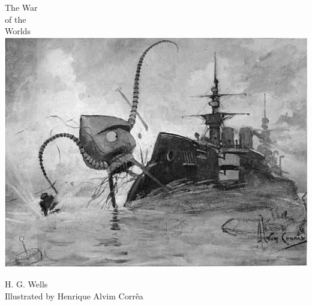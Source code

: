 \documentclass[
paper=5.5in:8.5in,
BCOR=7mm,
twoside,
DIV=calc,
11pt,
usegeometry,
chapterprefix,
headings=big]{scrbook} %
\newcommand{\moderatelyhuge}{\fontsize{40}{50}\selectfont}
\newcommand{\reasonablyhuge}{\fontsize{30}{40}\selectfont}
\def\coversize{0.8\textwidth}
\newcommand{\HUGE}{\fontsize{50}{60}\selectfont}
\def\coversize{\textwidth}
\newcommand{\HUGE}{\fontsize{60}{70}\selectfont}
\begin{document}
\frontmatter




  \begin{titlepage}
   \recalctypearea

  \begin{center}\mytitlefont
{\HUGE The War}\\
\vspace{0.5cm}
{\moderatelyhuge of the}\\
\vspace{0.2cm}
{\HUGE Worlds}\\
\vspace*{1cm}
\includegraphics[width=\coversize]{painting}\\
 \end{center}
 \vspace*{0.1cm}
 \begin{center}\mytitlefont
{\reasonablyhuge H. G. Wells}\\
\vspace{0.5cm}
{\Huge Illustrated by}
\vspace{0.1cm}
{\Huge Henrique Alvim Corrêa}
\end{center}
  \end{titlepage}
\end{document}
